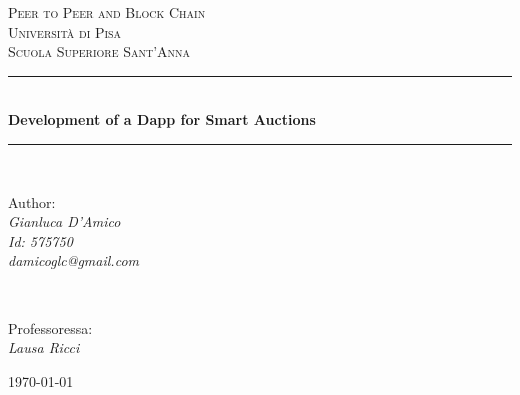 \begin{titlepage}
	\newcommand{\HRule}{\rule{\linewidth}{0.5mm}}
	
	\centering
	

	
	\textsc{\LARGE Peer to Peer and Block Chain}\\[1.5cm] 

	\textsc{\Large Università di Pisa}\\[0.5cm]
	\textsc{\Large Scuola Superiore Sant’Anna}\\[0.5cm]
	

	
	\HRule\\[0.4cm]
	
	{\huge\bfseries Development of a Dapp for Smart Auctions}\\[0.4cm] 
	
	\HRule\\[1.5cm]
	
	\begin{minipage}{0.4\textwidth}
		\begin{flushleft}
			\large
			Author:\\
			\textit{Gianluca D'Amico}\\
			\textit{Id: 575750}\\
			\textit{damicoglc@gmail.com}
		\end{flushleft}
	\end{minipage}
	~
	\begin{minipage}{0.4\textwidth}
		\begin{flushright}
			\large
			Professoressa:\\
			\textit{Lausa Ricci}
		\end{flushright}
	\end{minipage}
	
	\vfill\vfill\vfill 
	
	{\large\today} 
	\vfill 
	
\end{titlepage}